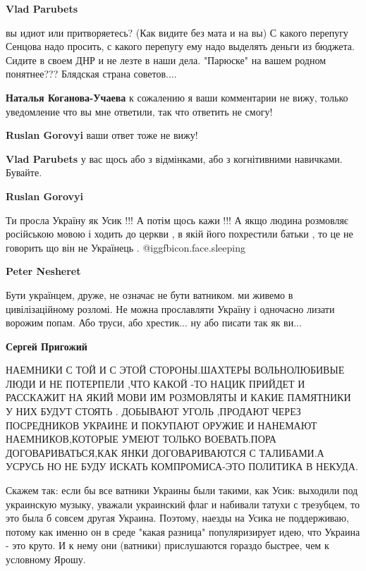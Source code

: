 \begin{itemize}
\begin{itemize}
\textbf{Vlad Parubets} 

вы идиот или притворяетесь? (Как видите без мата и на вы) С какого перепугу
Сенцова надо просить, с какого перепугу ему надо выделять деньги из бюджета.
Сидите в своем ДНР и не лезте в наши дела. "Парюске" на вашем родном
понятнее??? Блядская страна советов....


\textbf{Наталья Коганова-Учаева} к сожалению я ваши комментарии не вижу, только уведомление что вы мне ответили, так что ответить не смогу!

\textbf{Ruslan Gorovyi} ваши ответ тоже не вижу!


\textbf{Vlad Parubets} у вас щось або з відмінками, або з когнітивними навичками. Бувайте.

\textbf{Ruslan Gorovyi} 

Ти просла Україну як Усик !!! А потім щось кажи !!! А якщо людина розмовляє
російською мовою і ходить до церкви , в якій його похрестили батьки , то це не
говорить що він не Українець .  @igg{fbicon.face.sleeping} 


\textbf{Peter Nesheret} 

Бути українцем, друже, не означає не бути ватником. ми живемо в цивілізаційному
розломі. Не можна прославляти Україну і одночасно лизати ворожим попам. Або
труси, або хрестик... ну або писати так як ви...

\textbf{Сергей Пригожий} 

НАЕМНИКИ С ТОЙ И С ЭТОЙ СТОРОНЫ.ШАХТЕРЫ ВОЛЬНОЛЮБИВЫЕ ЛЮДИ И НЕ ПОТЕРПЕЛИ ,ЧТО
КАКОЙ -ТО НАЦИК ПРИЙДЕТ И РАССКАЖИТ НА ЯКИЙ МОВИ ИМ РОЗМОВЛЯТЫ И КАКИЕ
ПАМЯТНИКИ У НИХ БУДУТ СТОЯТЬ . ДОБЫВАЮТ УГОЛЬ ,ПРОДАЮТ ЧЕРЕЗ ПОСРЕДНИКОВ
УКРАИНЕ И ПОКУПАЮТ ОРУЖИЕ И НАНЕМАЮТ НАЕМНИКОВ,КОТОРЫЕ УМЕЮТ ТОЛЬКО
ВОЕВАТЬ.ПОРА ДОГОВАРИВАТЬСЯ,КАК ЯНКИ ДОГОВАРИВАЮТСЯ С ТАЛИБАМИ.А УСРУСЬ НО НЕ
БУДУ ИСКАТЬ КОМПРОМИСА-ЭТО ПОЛИТИКА В НЕКУДА.



Скажем так: если бы все ватники Украины были такими, как Усик: выходили под
украинскую музыку, уважали украинский флаг и набивали татухи с трезубцем, то
это была б совсем другая Украина. Поэтому, наезды на Усика не поддерживаю,
потому как именно он в среде "какая разница" популяризирует идею, что Украина -
это круто. И к нему они (ватники) прислушаются гораздо быстрее, чем к условному
Ярошу.


\end{itemize}
\end{itemize}
